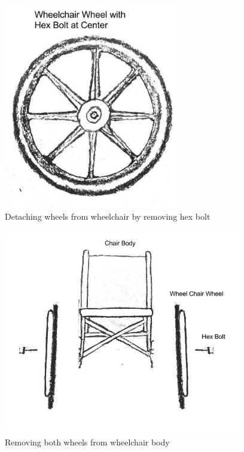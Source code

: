 \documentclass[12pt]{report}
\begin{document}
\begin{figure}[H]
    \centering
    \includegraphics[height=9cm]{tires/wheel}
    \caption{Detaching wheels from wheelchair by removing hex bolt}
    \label{fig:tires-step2}
\end{figure}

\begin{figure}[H]
    \centering
    \includegraphics[height=9cm]{tires/detach}
    \caption{Removing both wheels from wheelchair body}
    \label{fig:tires-step3}
\end{figure}
\end{document}
